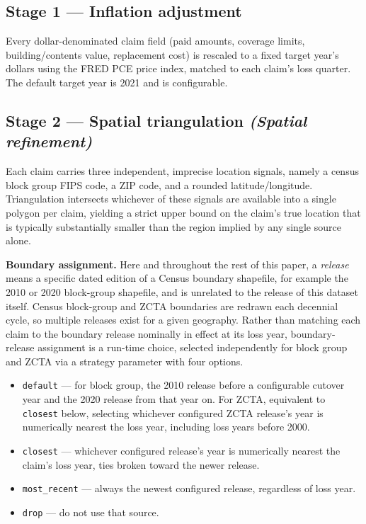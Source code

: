 \subsection*{Stage 1 --- Inflation adjustment}

Every dollar-denominated claim field (paid amounts, coverage limits,
building/contents value, replacement cost) is rescaled to a fixed target
year's dollars using the FRED PCE price index, matched to each claim's
loss quarter. The default target year is 2021 and is configurable.

\subsection*{Stage 2 --- Spatial triangulation \emph{(Spatial refinement)}}

Each claim carries three independent, imprecise location signals,
namely a census block group FIPS code, a ZIP code, and a rounded
latitude/longitude. Triangulation intersects whichever of these signals
are available into a single polygon per claim, yielding a strict upper
bound on the claim's true location that is typically substantially
smaller than the region implied by any single source alone.

\textbf{Boundary assignment.} Here and throughout the rest of this
paper, a \emph{release} means a specific dated edition of a Census boundary
shapefile, for example the 2010 or 2020 block-group shapefile, and is
unrelated to the release of this dataset itself. Census block-group
and ZCTA boundaries are redrawn each decennial cycle, so multiple
releases exist for a given geography.
%
Rather than matching each claim to the boundary release nominally in effect at its loss year,
boundary-release assignment is a run-time choice, selected
independently for block group and ZCTA via a strategy parameter with
four options.

\begin{itemize}
  \item \texttt{default} --- for block group, the 2010 release before a
    configurable cutover year and the 2020 release from that year on.
    For ZCTA, equivalent to \texttt{closest} below, selecting whichever
    configured ZCTA release's year is numerically nearest the loss
    year, including loss years before 2000.
  \item \texttt{closest} --- whichever configured release's year is
    numerically nearest the claim's loss year, ties broken toward the
    newer release.
  \item \texttt{most\_recent} --- always the newest configured release,
    regardless of loss year.
  \item \texttt{drop} --- do not use that source.
\end{itemize}

